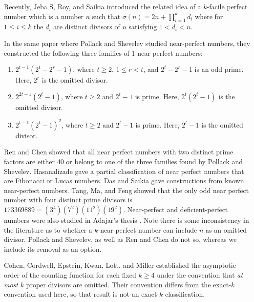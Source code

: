 \documentclass[10pt]{article}
\theoremstyle{definition}
\begin{document}
Recently, Jeba S, Roy, and Saikia \cite{JRS} introduced the related idea of a $k$-facile perfect number which is a number $n$ such that $\sigma(n)= 2n + \prod_{i=1}^k d_i$ where for $1 \leq i \leq k$ the $d_i$ are distinct divisors of $n$ satisfying $1<d_i<n$. 


In the same paper where Pollack and Shevelev studied near-perfect numbers, they constructed the following three families of $1$-near perfect numbers:
\begin{enumerate}
\item $2^{t-1}(2^t-2^r-1)$, where $t\ge2$, $1\le r<t$, and
      $2^t-2^r-1$ is an odd prime. Here, $2^r$ is the omitted divisor.
\item $2^{2t-1}(2^t-1)$, where $t\ge2$ and $2^t-1$ is prime.
      Here, $2^t(2^t-1)$ is the omitted divisor.
\item $2^{t-1}(2^t-1)^2$, where $t\ge2$ and $2^t-1$ is prime.
      Here, $2^t-1$ is the omitted divisor.
\end{enumerate}

Ren and Chen \cite{RC} showed that all near perfect numbers with two distinct prime factors are either 40 or belong to one of the three families found by Pollack and Shevelev. Hasanalizade \cite{EH} gave a partial classification of near perfect numbers that are Fibonacci or Lucas numbers. Das and Saikia \cite{DasSaikia} gave constructions from known near-perfect numbers. Tang, Ma, and Feng \cite{TMF} showed that the only odd near perfect number with four distinct prime divisors is $173369889=(3^4)(7^2)(11^2)(19^2).$ Near-perfect and deficient-perfect numbers were also studied in Adajar's thesis \cite{Adajar}. Note there is some inconsistency in the literature as to whether a $k$-near perfect number can include $n$ as an omitted divisor. Pollack and Shevelev, as well as Ren and Chen do not so, whereas we include its removal as an option.


Cohen, Cordwell, Epstein, Kwan, Lott, and Miller \cite{CCEKLM}
established the asymptotic order of the counting function for each fixed
$k\ge4$ under the convention that \emph{at most} $k$ proper divisors
are omitted. Their convention differs from the exact-$k$ convention
used here, so that result is not an exact-$k$ classification.
\end{document}

